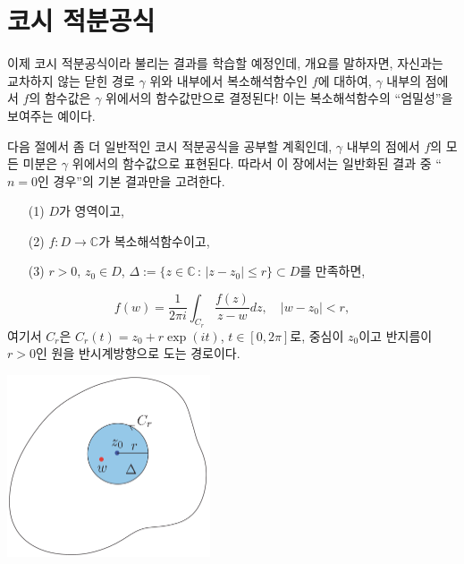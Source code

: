 \section{코시 적분공식}

이제 코시 적분공식이라 불리는 결과를 학습할 예정인데,
개요를 말하자면, 자신과는 교차하지 않는 닫힌 경로 $\gamma$ 위와
내부에서 복소해석함수인 $f$에 대하여,
$\gamma$ 내부의 점에서 $f$의 함수값은
$\gamma$ 위에서의 함수값만으로 결정된다!
이는 복소해석함수의 ``엄밀성''을 보여주는 예이다.

다음 절에서 좀 더 일반적인 코시 적분공식을 공부할 계획인데,
$\gamma$ 내부의 점에서 $f$의 모든 미분은 
$\gamma$ 위에서의 함수값으로 표현된다.
따라서 이 장에서는 일반화된 결과 중 ``$n=0$인 경우''의 기본 결과만을 고려한다.


\vfill

\begin{salttheorem} {}{} \label{thm-3-6}
\begin{itemize}
\item[(1)] $D$가 영역이고,
\item[(2)] $f:D\to\mathbb C$가 복소해석함수이고,
\item[(3)] $r>0$, $z_0\in D$, 
$\Delta := \{ z\in \mathbb C\,:\, |z-z_0| \le r\} \subset D$를 만족하면,
\end{itemize}
\[
f(w) = \dfrac1{2\pi i} \int_{C_r} \dfrac{f(z)}{z-w} dz, 
\quad |w-z_0| <r,
\]
여기서 $C_r$은 $C_r(t) = z_0 + r\exp(it)$, $t\in [0,2\pi]$로,
중심이 $z_0$이고 반지름이 $r>0$인 
원을 반시계방향으로 도는 경로이다.

\begin{center}
\includegraphics[width=0.45\textwidth]{./SaltChapter/figs/fig-3-0-7}
\end{center}
\end{salttheorem}




